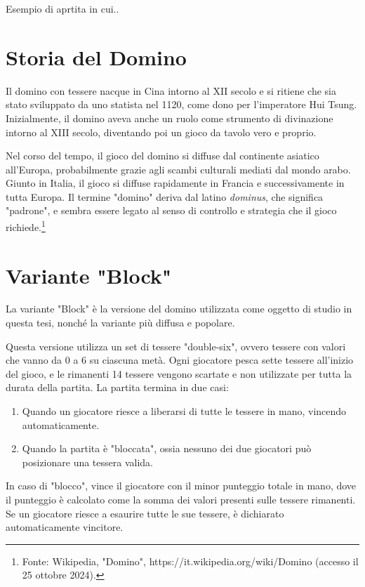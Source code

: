 \documentclass[a4paper,12pt]{report} %
\begin{document}
Esempio di aprtita in cui..


\section{Storia del Domino}

Il domino con tessere nacque in Cina intorno al XII secolo e si ritiene che sia stato sviluppato da uno statista nel 1120, come dono per l'imperatore Hui Tsung. Inizialmente, il domino aveva anche un ruolo come strumento di divinazione intorno al XIII secolo, diventando poi un gioco da tavolo vero e proprio.

Nel corso del tempo, il gioco del domino si diffuse dal continente asiatico all'Europa, probabilmente grazie agli scambi culturali mediati dal mondo arabo. Giunto in Italia, il gioco si diffuse rapidamente in Francia e successivamente in tutta Europa. Il termine "domino" deriva dal latino \textit{dominus}, che significa "padrone", e sembra essere legato al senso di controllo e strategia che il gioco richiede.\footnote{Fonte: Wikipedia, "Domino", https://it.wikipedia.org/wiki/Domino (accesso il 25 ottobre 2024).}

\section{Variante "Block"}

La variante "Block" è la versione del domino utilizzata come oggetto di studio in questa tesi, nonché la variante più diffusa e popolare.

Questa versione utilizza un set di tessere "double-six", ovvero tessere con valori che vanno da 0 a 6 su ciascuna metà. Ogni giocatore pesca sette tessere all'inizio del gioco, e le rimanenti 14 tessere vengono scartate e non utilizzate per tutta la durata della partita. La partita termina in due casi:

\begin{enumerate}
    \item Quando un giocatore riesce a liberarsi di tutte le tessere in mano, vincendo automaticamente.
    \item Quando la partita è "bloccata", ossia nessuno dei due giocatori può posizionare una tessera valida.
\end{enumerate}

In caso di "blocco", vince il giocatore con il minor punteggio totale in mano, dove il punteggio è calcolato come la somma dei valori presenti sulle tessere rimanenti. Se un giocatore riesce a esaurire tutte le sue tessere, è dichiarato automaticamente vincitore.
\end{document}
